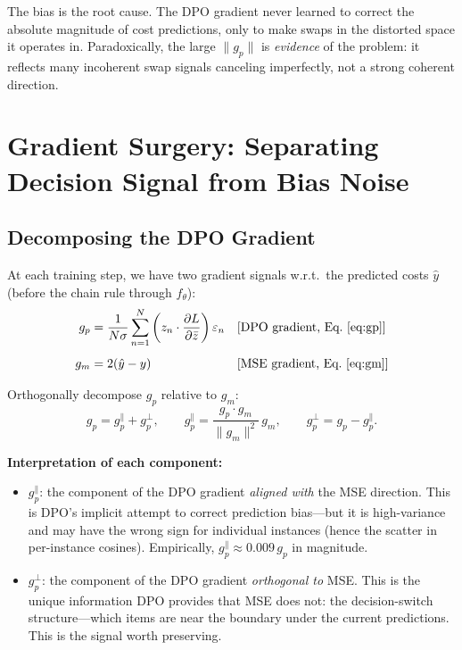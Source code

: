 \documentclass[11pt]{article}
\begin{document}
The bias is the root cause.  The DPO gradient never learned to correct the
absolute magnitude of cost predictions, only to make swaps in the distorted
space it operates in.  Paradoxically, the large $\|g_p\|$ is \emph{evidence} of
the problem: it reflects many incoherent swap signals canceling imperfectly,
not a strong coherent direction.

\section{Gradient Surgery: Separating Decision Signal from Bias Noise}

\subsection{Decomposing the DPO Gradient}

At each training step, we have two gradient signals w.r.t.\ the predicted
costs $\hat{y}$ (before the chain rule through $f_\theta$):
\begin{align}
  g_p &= \frac{1}{N\sigma}\sum_{n=1}^{N}
    \left(z_n \cdot \frac{\partial L}{\partial \bar{z}}\right)\varepsilon_n
  &&\text{[DPO gradient, Eq.~\eqref{eq:gp}]} \\[4pt]
  g_m &= 2(\hat{y} - y)
  &&\text{[MSE gradient, Eq.~\eqref{eq:gm}]}
\end{align}

Orthogonally decompose $g_p$ relative to $g_m$:
\begin{equation}
  g_p = g_p^{\parallel} + g_p^{\perp},
  \qquad
  g_p^{\parallel} = \frac{g_p \cdot g_m}{\|g_m\|^2}\, g_m,
  \qquad
  g_p^{\perp} = g_p - g_p^{\parallel}.
  \label{eq:decomp}
\end{equation}

\textbf{Interpretation of each component:}
\begin{itemize}[itemsep=2pt]
  \item $g_p^{\parallel}$: the component of the DPO gradient \emph{aligned with}
        the MSE direction.  This is DPO's implicit attempt to correct prediction
        bias---but it is high-variance and may have the wrong sign for individual
        instances (hence the scatter in per-instance cosines).  Empirically,
        $g_p^{\parallel} \approx 0.009\, g_p$ in magnitude.

  \item $g_p^{\perp}$: the component of the DPO gradient \emph{orthogonal to}
        MSE.  This is the unique information DPO provides that MSE does not:
        the decision-switch structure---which items are near the boundary under
        the current predictions.  This is the signal worth preserving.
\end{itemize}
\end{document}
